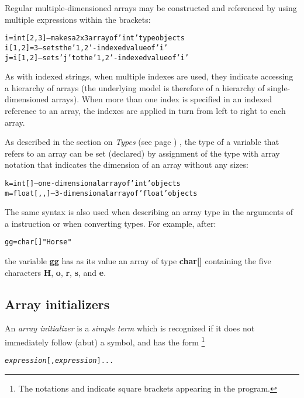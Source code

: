 Regular multiple-dimensioned arrays may be constructed and referenced by
using multiple expressions within the brackets:
\begin{alltt}
i=int[2,3] -- makes a 2x3 array of 'int' type objects
i[1,2]=3   -- sets the '1,2'-indexed value of 'i'
j=i[1,2]   -- sets 'j' to the '1,2'-indexed value of 'i'
\end{alltt}
 As with indexed strings, when multiple indexes are used, they
indicate accessing a hierarchy of arrays (the underlying model is
therefore of a hierarchy of single-dimensioned arrays).
When more than one index is specified in an indexed reference to an
array, the indexes are applied in turn from left to right to each
array.
 
As described in the section on  \emph{Types} (see page \pageref{reftypes}) , the
type of a variable that refers to an array can be set (declared) by
assignment of the type with array notation that indicates the dimension
of an array without any sizes:
\begin{alltt}
k=int[]     -- one-dimensional array of 'int' objects
m=float[,,] -- 3-dimensional array of 'float' objects
\end{alltt}

The same syntax is also used when describing an array type in the
arguments of a  instruction or when converting types.
For example, after:
\begin{alltt}
gg=char[] "Horse"
\end{alltt}
the variable \textbf{gg} has as its value an array of
type \textbf{char[]} containing the five
characters \textbf{H}, \textbf{o}, \textbf{r}, \textbf{s},
and \textbf{e}.
\subsection{Array initializers}\label{refarrin}
 
An \emph{array initializer} is a \emph{simple term} which is
recognized if it does not immediately follow (abut) a symbol, and has
the form
\footnote{
The notations \keyword{'['} and \keyword{']'}
indicate square brackets appearing in the \nr{} program.
}
\begin{alltt}
\keyword{'['}\emph{expression}[,\emph{expression}]...\keyword{']'}
\end{alltt}
 
